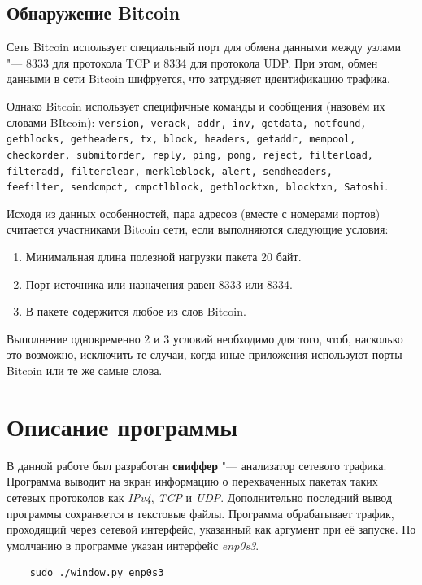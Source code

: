 \documentclass[bachelor, och, coursework]{SCWorks}
\begin{document}
\subsection{Обнаружение Bitcoin}
Сеть Bitcoin использует специальный порт для обмена данными между узлами "--- 8333 для протокола TCP и 8334 для протокола UDP. При этом, обмен данными в сети Bitcoin шифруется, что затрудняет идентификацию трафика.

Однако Bitcoin использует специфичные команды и сообщения (назовём их словами BItcoin): 
\texttt{version, verack, addr, inv, getdata, notfound, getblocks, getheaders, tx,  
block, headers, getaddr, mempool, \\ checkorder, submitorder, reply, ping, pong, reject, 
filterload, \\ filteradd, filterclear, merkleblock, alert, sendheaders, \\ feefilter,
sendcmpct, cmpctlblock, getblocktxn, blocktxn, Satoshi}.

Исходя из данных особенностей, пара адресов (вместе с номерами портов) считается участниками Bitcoin сети, если выполняются следующие условия:
\begin{enumerate}
    \item Минимальная длина полезной нагрузки пакета 20 байт.
    \item Порт источника или назначения равен 8333 или 8334.
    \item В пакете содержится любое из слов Bitcoin.
\end{enumerate}

Выполнение одновременно 2 и 3 условий необходимо для того, чтоб, насколько это возможно, исключить те случаи, когда иные приложения используют порты Bitcoin или те же самые слова.


\section{Описание программы}
В данной работе был разработан \textbf{сниффер} "--- анализатор сетевого трафика. 
Программа выводит на экран информацию о перехваченных пакетах таких сетевых протоколов как \textit{IPv4}, \textit{TCP} и \textit{UDP}. 
Дополнительно последний вывод программы сохраняется в текстовые файлы. Программа обрабатывает трафик, проходящий через сетевой интерфейс, указанный как аргумент при её запуске. По умолчанию в программе указан интерфейс \textit{enp0s3}.

\begin{verbatim}
    sudo ./window.py enp0s3
\end{verbatim}
\end{document}
